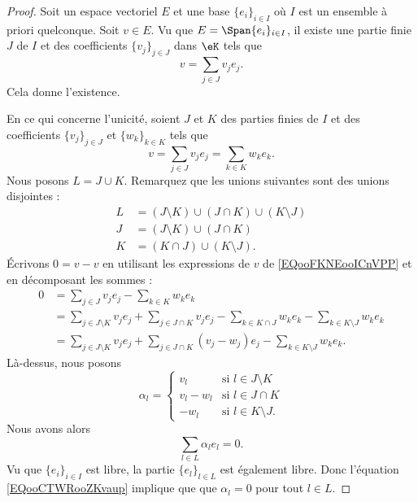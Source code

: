 \begin{proof}
    Soit un espace vectoriel \( E\) et une base \( \{ e_i \}_{i\in I}\) où \( I\) est un ensemble à priori quelconque. Soit \( v\in E\). Vu que \( E=\Span\{ e_i \}_{i\in I}\), il existe une partie finie \( J\) de \( I\) et des coefficients \( \{ v_j \}_{j\in J}\) dans \( \eK\) tels que
    \begin{equation}
        v=\sum_{j\in J}v_je_j.
    \end{equation}
    Cela donne l'existence.

    En ce qui concerne l'unicité, soient \( J \) et \( K\) des parties finies de \( I\) et des coefficients \( \{ v_j \}_{j\in J}\) et \( \{ w_{k} \}_{k\in K}\) tels que
    \begin{equation}        \label{EQooFKNEooICnVPP}
        v=\sum_{j\in J}v_je_j=\sum_{k\in K}w_{k}e_{k}.
    \end{equation}
    Nous posons \( L=J\cup K\). Remarquez que les unions suivantes sont des unions disjointes :
    \begin{subequations}
        \begin{align}
            L&=(J\setminus K)\cup (J\cap K)\cup (K\setminus J)\\
            J&=(J\setminus K)\cup (J\cap K)\\
            K&=(K\cap J)\cup(K\setminus J).
        \end{align}
    \end{subequations}
    Écrivons \( 0=v-v\) en utilisant les expressions de \( v\) de \eqref{EQooFKNEooICnVPP} et en décomposant les sommes :
    \begin{subequations}
        \begin{align}
            0&=\sum_{j\in J}v_je_j-\sum_{k\in K}w_ke_k\\
            &=\sum_{j\in J\setminus K}v_je_j+\sum_{j\in J\cap K}v_je_j-\sum_{k\in K\cap J}w_ke_k-\sum_{k\in K\setminus J}w_ke_k\\
            &=\sum_{j\in J\setminus K}v_je_j+\sum_{j\in J\cap K}(v_j-w_j)e_j-\sum_{k\in K\setminus J}w_ke_k.
        \end{align}
    \end{subequations}
    Là-dessus, nous posons
    \begin{equation}
        \alpha_l=\begin{cases}
            v_l    &   \text{si } l\in J\setminus K\\
           v_l-w_l    &    \text{si } l\in J\cap K\\
           -w_l&\text{si }l\in K\setminus J.
        \end{cases}
    \end{equation}
    Nous avons alors
    \begin{equation}        \label{EQooCTWRooZKvaup}
        \sum_{l\in L}\alpha_le_l=0.
    \end{equation}
    Vu que \( \{ e_i \}_{i\in I}\) est libre, la partie \( \{ e_l \}_{l\in L}\) est également libre. Donc l'équation \eqref{EQooCTWRooZKvaup} implique que que \( \alpha_l=0\) pour tout \( l\in L\).


\end{proof}
